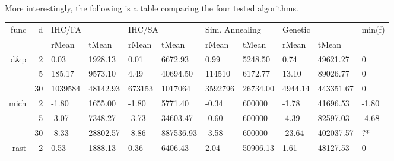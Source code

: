 \documentclass{article}
\begin{document}
    \paragraph{}
    More interestingly, the following is a table comparing the four tested algorithms.

    \begin{table}[!h]
        \setlength\tabcolsep{3pt}
        {\footnotesize
        \begin{tabular}{rr|llllllll|l}
        \multirow{2}{*}{func}       & \multirow{2}{*}{d} & \multicolumn{2}{l}{IHC/FA} & \multicolumn{2}{l}{IHC/SA} & \multicolumn{2}{l}{Sim. Annealing} & \multicolumn{2}{l}{Genetic} & \multirow{2}{*}{min(f)} \\
                                        &                    & rMean        & tMean       & rMean       & tMean        & rMean           & tMean            & rMean       & tMean         &                         \\
        \hline
        \multirow{3}{*}{d\&p} & 2                  & 0.03         & 1928.13     & 0.01        & 6672.93      & 0.99            & 5248.50          & 0.74        & 49621.27      & 0                       \\
                                        & 5                  & 185.17       & 9573.10     & 4.49        & 40694.50     & 114510       & 6172.77          & 13.10       & 89026.77      & 0                       \\
                                        & 30                 & 1039584   & 48142.93    & 673153  & 1017064  & 3592796      & 26734.00         & 4944.14     & 443351.67     & 0                       \\
        \multirow{3}{*}{mich}    & 2                  & -1.80        & 1655.00     & -1.80       & 5771.40      & -0.34           & 600000    & -1.78       & 41696.53      & -1.80                 \\
                                        & 5                  & -3.07        & 7348.27     & -3.73       & 34603.47     & -0.60           & 600000     & -4.39       & 82597.03      & -4.68               \\
                                        & 30                 & -8.33        & 28802.57    & -8.86       & 887536.93    & -3.58           & 600000     & -23.64      & 402037.57     & ?*                \\
        \multirow{3}{*}{rast}      & 2                  & 0.53         & 1888.13     & 0.36        & 6406.43      & 2.04            & 50906.13         & 1.61        & 48127.53      & 0                       \\

\end{tabular}}
\end{table}
\end{document}
